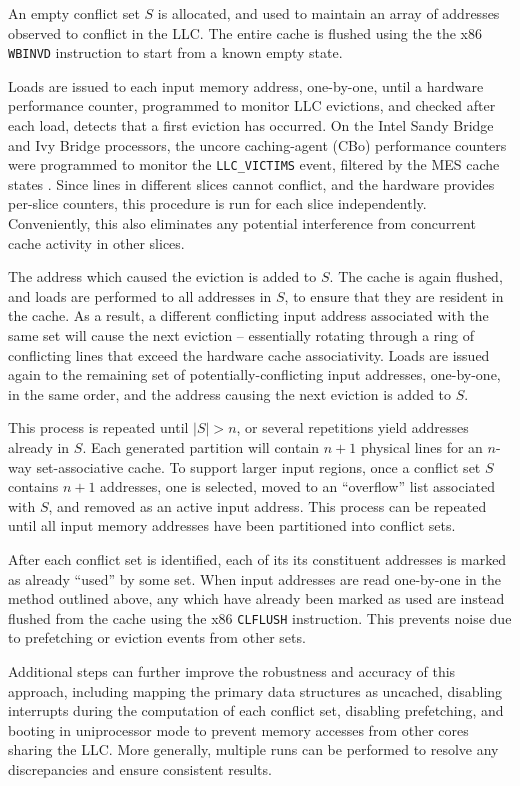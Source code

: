 An empty conflict set $S$ is allocated, and used to maintain an array
of addresses observed to conflict in the LLC.
The entire cache is flushed using the the x86 {\tt WBINVD} instruction
to start from a known empty state.

Loads are issued to each input memory address, one-by-one, until a
hardware performance counter, programmed to monitor LLC evictions, and
checked after each load, detects that a first eviction has occurred.
On the Intel Sandy Bridge and Ivy Bridge processors, the uncore
caching-agent (CBo) performance counters were programmed to monitor
the {\tt LLC\_VICTIMS} event, filtered by the MES cache states
\cite{Intel-Uncore-E5-2600}.  Since lines in different slices cannot
conflict, and the hardware provides per-slice counters, this procedure
is run for each slice independently.  Conveniently, this also
eliminates any potential interference from concurrent cache activity
in other slices.

The address which caused the eviction is added to $S$.  The cache is
again flushed, and loads are performed to all addresses in $S$,
to ensure that they are resident in the cache.  As a result, a
different conflicting input address associated with the same set will
cause the next eviction -- essentially rotating through a ring of
conflicting lines that exceed the hardware cache associativity.  Loads
are issued again to the remaining set of potentially-conflicting input
addresses, one-by-one, in the same order, and the address causing the
next eviction is added to $S$.

This process is repeated until $|S| > n$, or several repetitions yield
addresses already in $S$.  Each generated partition will contain $n+1$
physical lines for an $n$-way set-associative cache.  To support
larger input regions, once a conflict set $S$ contains $n+1$
addresses, one is selected, moved to an ``overflow'' list associated
with $S$, and removed as an active input address.  This process can be
repeated until all input memory addresses have been partitioned into
conflict sets.

After each conflict set is identified, each of its its constituent
addresses is marked as already ``used'' by some set.  When input
addresses are read one-by-one in the method outlined above, any which
have already been marked as used are instead flushed from the cache
using the x86 {\tt CLFLUSH} instruction.  This prevents noise due to
prefetching or eviction events from other sets.

Additional steps can further improve the robustness and accuracy of
this approach, including mapping the primary data structures as
uncached, disabling interrupts during the computation of each
conflict set, disabling prefetching, and booting in uniprocessor mode
to prevent memory accesses from other cores sharing the LLC.  More
generally, multiple runs can be performed to resolve any discrepancies
and ensure consistent results.

